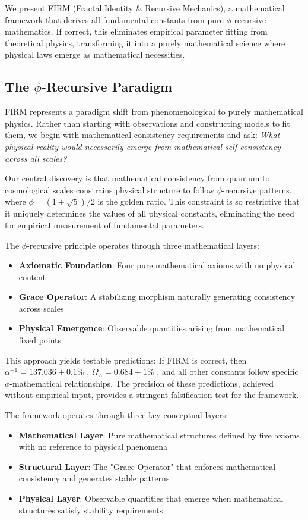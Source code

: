 \documentclass[12pt]{article}
\begin{document}
We present FIRM (Fractal Identity \& Recursive Mechanics), a mathematical framework that derives all fundamental constants from pure $\phi$-recursive mathematics. If correct, this eliminates empirical parameter fitting from theoretical physics, transforming it into a purely mathematical science where physical laws emerge as mathematical necessities.

\subsection{The $\phi$-Recursive Paradigm}

FIRM represents a paradigm shift from phenomenological to purely mathematical physics. Rather than starting with observations and constructing models to fit them, we begin with mathematical consistency requirements and ask: \emph{What physical reality would necessarily emerge from mathematical self-consistency across all scales?}

Our central discovery is that mathematical consistency from quantum to cosmological scales constrains physical structure to follow $\phi$-recursive patterns, where $\phi = (1+\sqrt{5})/2$ is the golden ratio. This constraint is so restrictive that it uniquely determines the values of all physical constants, eliminating the need for empirical measurement of fundamental parameters.

The $\phi$-recursive principle operates through three mathematical layers:
\begin{itemize}
    \item \textbf{Axiomatic Foundation}: Four pure mathematical axioms with no physical content
    \item \textbf{Grace Operator}: A stabilizing morphism naturally generating consistency across scales  
    \item \textbf{Physical Emergence}: Observable quantities arising from mathematical fixed points
\end{itemize}

This approach yields testable predictions: If FIRM is correct, then $\alpha^{-1} = 137.036 \pm 0.1\%$ \citep{CODATA2018}, $\Omega_\Lambda = 0.684 \pm 1\%$ \citep{Planck2018}, and all other constants follow specific $\phi$-mathematical relationships. The precision of these predictions, achieved without empirical input, provides a stringent falsification test for the framework.

The framework operates through three key conceptual layers:
\begin{itemize}
    \item \textbf{Mathematical Layer}: Pure mathematical structures defined by five axioms, with no reference to physical phenomena
    \item \textbf{Structural Layer}: The "Grace Operator" that enforces mathematical consistency and generates stable patterns  
    \item \textbf{Physical Layer}: Observable quantities that emerge when mathematical structures satisfy stability requirements
\end{itemize}
\end{document}
